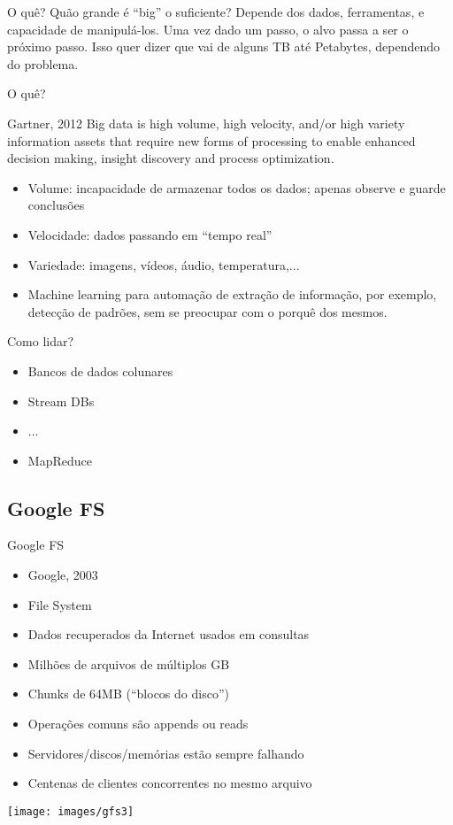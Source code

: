 \begin{frame}{O quê?}
	Quão grande é ``big'' o suficiente? \pause Depende dos dados, ferramentas, e capacidade de manipulá-los. \pause Uma vez dado um passo, o alvo passa a ser o próximo passo. \pause Isso quer dizer que vai de alguns TB até Petabytes, dependendo do problema.
\end{frame}


\begin{frame}{O quê?}
\begin{block}{Gartner, 2012}
Big data is high volume, high velocity, and/or high variety information assets that require new forms of processing to enable enhanced decision making, insight discovery and process optimization.
\end{block}

\begin{itemize}
	\item Volume: incapacidade de armazenar todos os dados; apenas observe e guarde conclusões
	\item Velocidade: dados passando em ``tempo real''
	\item Variedade: imagens, vídeos, áudio, temperatura,...
	\pause
	\item Machine learning para automação de extração de informação, por exemplo, detecção de padrões, sem se preocupar com o porquê dos mesmos.
\end{itemize}
\end{frame}



\begin{frame}{Como lidar?}
\begin{itemize}
	\item Bancos de dados colunares
	\item Stream DBs
	\item ...
	\item \alert{MapReduce}
\end{itemize}
\end{frame}

\subsection{Google FS}

\begin{frame}{Google FS}
\begin{itemize}
	\item Google, 2003
	\item File System
	\item Dados recuperados da Internet usados em consultas
	\item Milhões de arquivos de múltiplos GB
	\item Chunks de 64MB (``blocos do disco'')
	\item Operações comuns são appends ou reads
	\item Servidores/discos/memórias estão sempre falhando
	\item Centenas de clientes concorrentes no mesmo arquivo
\end{itemize}
\texttt{[image: images/gfs3]}
\end{frame}

